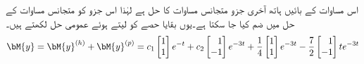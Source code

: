 اس مساوات کے بائیں ہاتھ آخری جزو متجانس مساوات کا حل ہے لہٰذا اس جزو کو متجانس مساوات کے حل  میں ضم کیا جا سکتا ہے۔یوں بقایا حصے کو  لیتے ہوئے عمومی حل لکھتے ہیں۔
\begin{align}
\bM{y}=\bM{y}^{(h)}+\bM{y}^{(p)}=c_1\begin{bmatrix}1\\1  \end{bmatrix}e^{-t}+c_2\begin{bmatrix*}[r]1\\-1  \end{bmatrix*}e^{-3t}+\frac{1}{4} \begin{bmatrix}1\\1  \end{bmatrix}e^{-3t}-\frac{7}{2}\begin{bmatrix*}[r]1\\ -1  \end{bmatrix*}te^{-3t}
\end{align}
